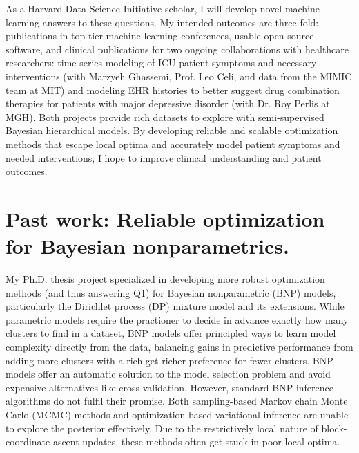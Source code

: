 \documentclass[11pt,letterpaper,sans]{article}
\begin{document}
As a Harvard Data Science Initiative scholar, 
I will develop novel machine learning answers to these questions.
My intended outcomes are three-fold: publications in top-tier machine learning conferences, usable open-source software,
and clinical publications for two ongoing collaborations with healthcare researchers: time-series modeling of ICU patient symptoms and necessary interventions (with Marzyeh Ghassemi, Prof. Leo Celi, and data from the MIMIC team at MIT)
and modeling EHR histories 
to better suggest drug combination therapies for patients with major depressive disorder (with Dr. Roy Perlis at MGH).
Both projects provide rich datasets to explore with semi-supervised Bayesian hierarchical models. By developing reliable and scalable optimization methods that escape local optima and accurately model patient symptoms and needed interventions, I hope to improve clinical understanding and patient outcomes.






\section{Past work: Reliable optimization for Bayesian nonparametrics.}

My Ph.D. thesis project specialized in developing more robust optimization methods (and thus answering Q1) for Bayesian nonparametric (BNP) models, particularly the Dirichlet process (DP) mixture model and its extensions. 
While parametric models require the practioner to decide in advance exactly how many clusters to find in a dataset,
BNP models offer principled ways to 
learn model complexity directly from the data,
balancing gains in predictive performance from adding more clusters with a rich-get-richer preference for fewer clusters.
BNP models offer an automatic solution to the model selection problem and avoid expensive alternatives like cross-validation. 
However, standard BNP inference algorithms do not fulfil their promise. Both sampling-based Markov chain Monte Carlo (MCMC) methods and optimization-based variational inference are unable to explore the posterior effectively. Due to the restrictively local nature of block-coordinate ascent updates, these methods often get stuck in poor local optima.
\end{document}
